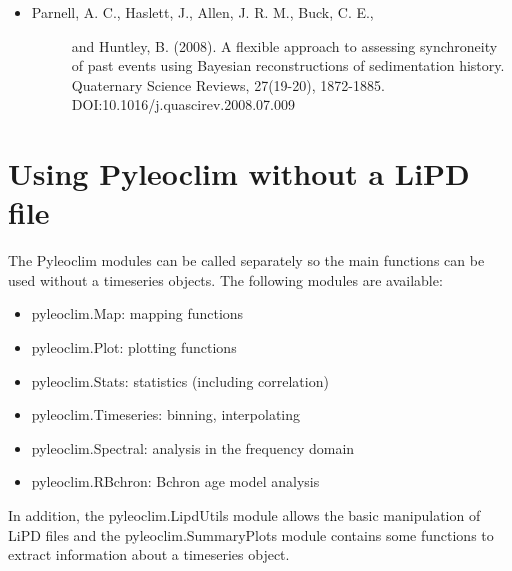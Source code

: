 \documentclass[letterpaper,10pt,english]{sphinxmanual}
\begin{document}
\begin{fulllineitems}
\begin{description}
\begin{itemize}
\begin{description}
\end{description}

\item {} \begin{description}
\item[{Parnell, A. C., Haslett, J., Allen, J. R. M., Buck, C. E., }] \leavevmode
and Huntley, B. (2008). A flexible approach to assessing 
synchroneity of past events using Bayesian reconstructions
of sedimentation history. Quaternary Science Reviews, 
27(19-20), 1872-1885. DOI:10.1016/j.quascirev.2008.07.009

\end{description}

\end{itemize}

\end{description}

\end{fulllineitems}



\section{Using Pyleoclim without a LiPD file}
\label{\detokenize{Main:using-pyleoclim-without-a-lipd-file}}
The Pyleoclim modules can be called separately so the main functions can be used without a timeseries objects.
The following modules are available:
\begin{itemize}
\item {} 
pyleoclim.Map: mapping functions

\item {} 
pyleoclim.Plot: plotting functions

\item {} 
pyleoclim.Stats: statistics (including correlation)

\item {} 
pyleoclim.Timeseries: binning, interpolating

\item {} 
pyleoclim.Spectral: analysis in the frequency domain

\item {} 
pyleoclim.RBchron: Bchron age model analysis

\end{itemize}

In addition, the pyleoclim.LipdUtils module allows the basic manipulation of LiPD files and the pyleoclim.SummaryPlots module
contains some functions to extract information about a timeseries object.
\end{document}
